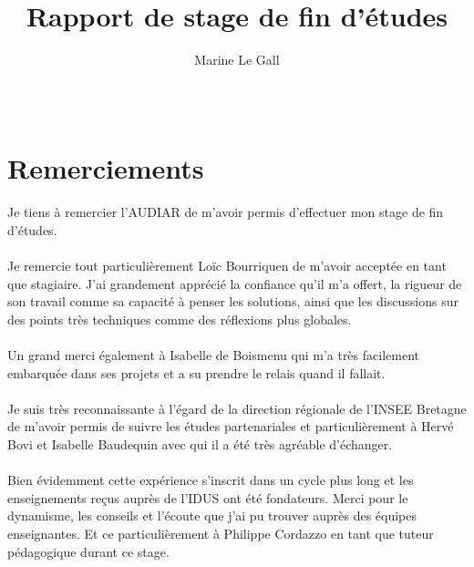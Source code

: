 \documentclass{bredele}
\title{Rapport de stage de fin d'études}
\author{Marine Le Gall}
\date{\\\centering{28 Septembre 2017}}
\begin{document}
\maketitle
\clearemptydoublepage
\chapter*{Remerciements}
\thispagestyle{empty}
Je tiens à remercier l'AUDIAR de m'avoir permis d'effectuer mon stage de fin d'études.\\\\
Je remercie tout particulièrement Loïc Bourriquen de m'avoir acceptée en tant que stagiaire. J'ai grandement apprécié la confiance qu'il m'a offert, la rigueur de son travail comme sa capacité à penser les solutions, ainsi que les discussions sur des points très techniques comme des réflexions plus globales.\\\\
Un grand merci également à Isabelle de Boismenu qui m'a très facilement embarquée dans ses projets et a su prendre le relais quand il fallait.\\\\
Je suis très reconnaissante à l'égard de la direction régionale de l'INSEE Bretagne de m'avoir permis de suivre les études partenariales et particulièrement à Hervé Bovi et Isabelle Baudequin avec qui il a été très agréable d'échanger.
\\\\Bien évidemment cette expérience s'inscrit dans un cycle plus long et les enseignements reçus auprès de l'IDUS ont été fondateurs. Merci pour le dynamisme, les conseils et l'écoute que j'ai pu trouver auprès des équipes enseignantes. Et ce particulièrement à Philippe Cordazzo en tant que tuteur pédagogique durant ce stage.
\clearemptydoublepage
\frontmatter
\end{document}
